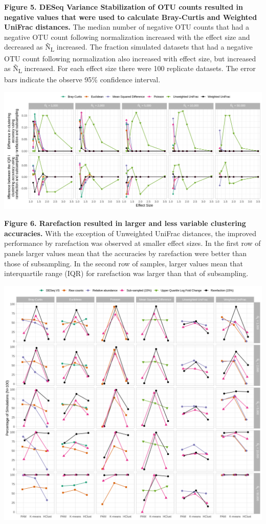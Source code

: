 \documentclass[
]{article}
\begin{document}
\textbf{Figure 5. DESeq Variance Stabilization of OTU counts resulted in
negative values that were used to calculate Bray-Curtis and Weighted
UniFrac distances.} The median number of negative OTU counts that had a
negative OTU count following normalization increased with the effect
size and decreased as Ñ\textsubscript{L} increased. The fraction
simulated datasets that had a negative OTU count following normalization
also increased with effect size, but increased as Ñ\textsubscript{L}
increased. For each effect size there were 100 replicate datasets. The
error bars indicate the observe 95\% confidence interval.

\newpage

\includegraphics{figure_06.png}

\textbf{Figure 6. Rarefaction resulted in larger and less variable
clustering accuracies.} With the exception of Unweighted UniFrac
distances, the improved performance by rarefaction was observed at
smaller effect sizes. In the first row of panels larger values mean that
the accuracies by rarefaction were better than those of subsampling. In
the second row of samples, larger values mean that interquartile range
(IQR) for rarefaction was larger than that of subsampling.

\newpage

\includegraphics{figure_07.png}
\end{document}
